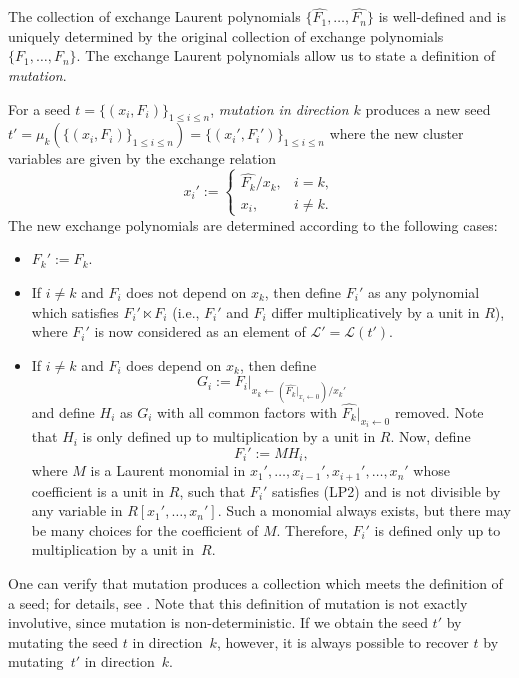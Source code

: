 \documentclass[pdftex]{sigma}
\numberwithin{equation}{section}
\begin{document}
The collection of exchange Laurent polynomials $\big\{ \hat{F_1}, \dots, \hat{F_n} \big\}$ is well-defined and is uniquely determined by the original collection of exchange polynomials $\{ F_1,\dots,F_n \}$. The exchange Laurent polynomials allow us to state a definition of \emph{mutation}.
\begin{Definition}
For a seed $t = \{ (x_i,F_i) \}_{1 \leq i \leq n}$, \emph{mutation in direction $k$} produces a new seed $t' = \mu_k(\{ (x_i,F_i) \}_{1 \leq i \leq n}) = \{ (x_i',F_i') \}_{1 \leq i \leq n}$ where the new cluster variables are given by the exchange relation
 \[
 x_i' := \begin{cases} \hat{F_k}/x_k, & i = k, \\ x_i, & i \neq k. \end{cases}
 \]
The new exchange polynomials are determined according to the following cases:
 \begin{itemize}\itemsep=0pt
 \item $F_k' := F_k$.
 \item If $i \neq k$ and $F_i$ does not depend on $x_k$, then define $F_i'$ as any polynomial which satisfies $F_i' \ltimes F_i$ (i.e., $F_i'$ and $F_i$ differ multiplicatively by a unit in $R$), where $F_i'$ is now considered as an element of $\mathcal{L}' = \mathcal{L}(t')$.
 \item If $i \neq k$ and $F_i$ does depend on $x_k$, then define
 \[ G_i := F_i\big|_{x_k \leftarrow (\hat{F_k}|_{x_i \leftarrow 0})/x_k'} \]
 and define $H_i$ as $G_i$ with all common factors with $ \hat{F_k}\big|_{x_i \leftarrow 0}$ removed. Note that $H_i$ is only defined up to multiplication by a unit in $R$. Now, define
 \[ F_i' := MH_i, \]
 where $M$ is a Laurent monomial in $x_1', \dots, x_{i-1}', x_{i+1}', \dots, x_n'$ whose coefficient is a unit in $R$, such that $F_i'$ satisfies (LP2) and is not divisible by any variable in $R[x_1',\dots,x_n']$. Such a monomial always exists, but there may be many choices for the coefficient of $M$. Therefore, $F_i'$ is defined only up to multiplication by a unit in~$R$.
 \end{itemize}
\end{Definition}
One can verify that mutation produces a collection which meets the definition of a seed; for details, see \cite[Section~2.2]{LP-12}. Note that this definition of mutation is not exactly involutive, since mutation is non-deterministic. If we obtain the seed $t'$ by mutating the seed $t$ in direction~$k$, however, it is always possible to recover $t$ by mutating~$t'$ in direction~$k$.
\end{document}
